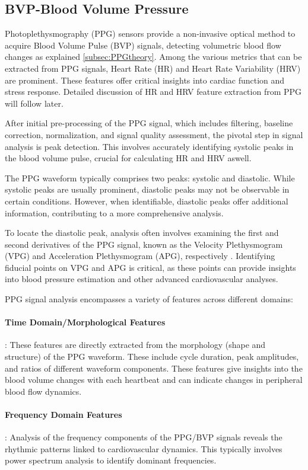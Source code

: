 \subsection{BVP-Blood Volume Pressure}
Photoplethysmography (PPG) sensors provide a non-invasive optical method to acquire Blood Volume Pulse (BVP) signals, detecting volumetric blood flow changes as explained \ref*{subsec:PPGtheory}. Among the various metrics that can be extracted from PPG signals, Heart Rate (HR) and Heart Rate Variability (HRV) are prominent. These features offer critical insights into cardiac function and stress response. Detailed discussion of HR and HRV feature extraction from PPG will follow later.

After initial pre-processing of the PPG signal, which includes filtering, baseline correction, normalization, and signal quality assessment, the pivotal step in signal analysis is peak detection. This involves accurately identifying systolic peaks in the blood volume pulse, crucial for calculating HR and HRV aswell.

The PPG waveform typically comprises two peaks: systolic and diastolic. While systolic peaks are usually prominent, diastolic peaks may not be observable in certain conditions. However, when identifiable, diastolic peaks offer additional information, contributing to a more comprehensive analysis.

To locate the diastolic peak, analysis often involves examining the first and second derivatives of the PPG signal, known as the Velocity Plethysmogram (VPG) and Acceleration Plethysmogram (APG), respectively \parencite{apg}. Identifying fiducial points on VPG and APG is critical, as these points can provide insights into blood pressure estimation and other advanced cardiovascular analyses.

PPG signal analysis encompasses a variety of features across different domains:

\paragraph*{Time Domain/Morphological Features}: These features are directly extracted from the morphology (shape and structure) of the PPG waveform.
These include cycle duration, peak amplitudes, and ratios of different waveform components. These features give insights into the blood volume changes with each heartbeat and can indicate changes in peripheral blood flow dynamics.
\paragraph*{Frequency Domain Features}: Analysis of the frequency components of the PPG/BVP signals reveals the rhythmic patterns linked to cardiovascular dynamics. This typically involves power spectrum analysis to identify dominant frequencies.
